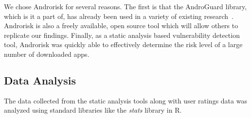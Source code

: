 We chose Androrisk for several reasons. The first is that the AndroGuard library, which is it a part of, has already been used in a variety of existing research~\cite{Egele:2013:ESC:2508859.2516693, Vidas:2014:AAA:2666620.2666630, Atzeni:2014:DYA:2692983.2693001}. Androrisk is also a freely available, open source tool which will allow others to replicate our findings. Finally, as a static analysis based vulnerability detection tool, Androrisk was quickly able to effectively determine the risk level of a large number of downloaded apps.



\subsection{Data Analysis}

The data collected from the static analysis tools along with user ratings data was analyzed using standard libraries like the {\it stats} library in R. 
